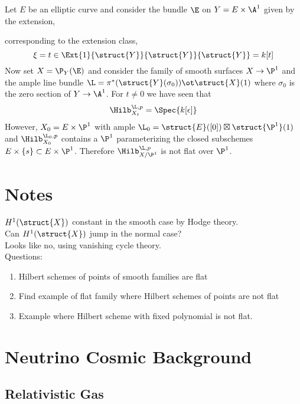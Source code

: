 \documentclass[12pt]{article}
\begin{document}
\begin{example}
Let $E$ be an elliptic curve and consider the bundle $\E$ on $Y = E \times \A^1$ given by the extension,
\begin{center}
\end{center}
corresponding to the extension class,
\[ \xi = t \in \Ext{1}{\struct{Y}}{\struct{Y}}{\struct{Y}} = k[t] \]
Now set $X = \P_Y(\E)$ and consider the family of smooth surfaces $X \to \P^1$ and the ample line bundle $\L = \pi^* (\struct{Y}(\sigma_0)) \ot \struct{X}(1)$ where $\sigma_0$ is the zero section of $Y \to \A^1$. For $t \neq 0$ we have seen that \[ \Hilb^{\L, p}_{X_t} = \Spec{k[\epsilon]} \]
However, $X_0 = E \times \P^1$ with ample $\L_0 = \struct{E}([0]) \boxtimes \struct{\P^1}(1)$ and $\Hilb^{\L_0, p}_{X_0}$ contains a $\P^1$ parameterizing the closed subschemes $E \times \{ s \} \subset E \times \P^1$. Therefore $\Hilb^{\L, p}_{X/\P^1}$ is not flat over $\P^1$.
\end{example}


\section{Notes}

$H^1(\struct{X})$ constant in the smooth case by Hodge theory. 
\bigskip\\
Can $H^1(\struct{X})$ jump in the normal case?
\bigskip\\
Looks like no, using vanishing cycle theory. 
\bigskip\\
Questions:

\begin{enumerate}
\item Hilbert schemes of points of smooth families are flat
\item Find example of flat family where Hilbert schemes of points are not flat
\item Example where Hilbert scheme with fixed polynomial is not flat.
\end{enumerate}

\section{Neutrino Cosmic Background}

\subsection{Relativistic Gas}
\end{document}
